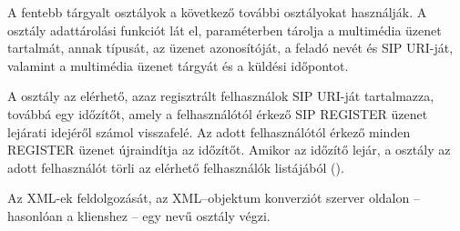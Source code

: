 \medskip

A fentebb tárgyalt osztályok a következő további osztályokat használják. A  osztály adattárolási funkciót lát el, paraméterben tárolja a multimédia üzenet tartalmát, annak típusát, az üzenet azonosítóját, a feladó nevét és SIP URI-ját, valamint a multimédia üzenet tárgyát és a küldési időpontot.

\medskip

A  osztály az elérhető, azaz regisztrált felhasználok SIP URI-ját tartalmazza, továbbá egy időzítőt, amely a felhasználótól érkező SIP REGISTER üzenet lejárati idejéről számol visszafelé. Az adott felhasználótól érkező minden REGISTER üzenet újraindítja az időzítőt. Amikor az időzítő lejár, a  osztály az adott felhasználót törli az elérhető felhasználók listájából ().

\medskip

Az XML-ek feldolgozását, az XML--objektum konverziót szerver oldalon -- hasonlóan a klienshez -- egy  nevű osztály végzi.